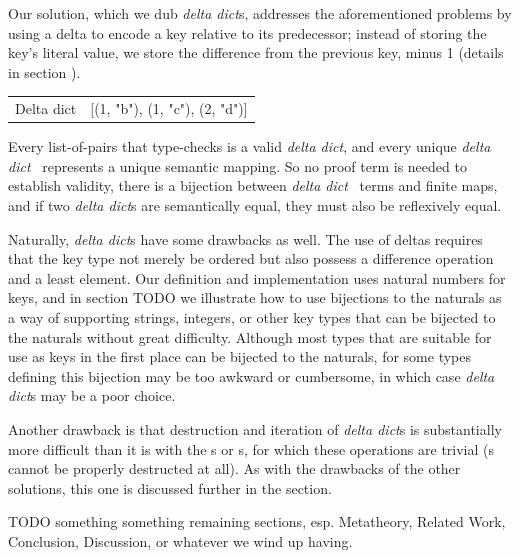 \documentclass[nonacm]{acmart}
\newcommand{\dd}{\emph{delta dict}}
\theoremstyle{slplain}
\numberwithin{thm}{section}
\begin{document}
Our solution, which we dub {\dd}s, addresses the aforementioned problems by using a delta to
encode a key relative to its predecessor; instead of storing the key's literal value, we store the difference
from the previous key, minus 1 (details in section ).
\\
\begin{tabular}{ l l }
 \quad\quad Delta dict & [(1, "b"), (1, "c"), (2, "d")]
\end{tabular}

Every list-of-pairs that type-checks is a valid \dd, and every unique \dd~ represents
a unique semantic mapping. So no proof term is needed to establish validity, there is a bijection between
\dd~ terms and finite maps, and if two {\dd}s are semantically equal, they must also be reflexively equal.

Naturally, {\dd}s have some drawbacks as well. The use of deltas requires that the key type not merely be
ordered but also possess a difference operation and a least element. Our definition and implementation uses
natural numbers for keys, and in section TODO we illustrate how to use bijections to the naturals as a way
of supporting strings, integers, or other key types that can be bijected to the naturals without great
difficulty. Although most types that are suitable for use as keys in the first place can be bijected to the
naturals, for some types defining this bijection may be too awkward or cumbersome, in which case {\dd}s may
be a poor choice.

Another drawback is that destruction and iteration of {\dd}s is substantially more
difficult than it is with the {\SAL}s or {\CAL}s, for which these operations are trivial
({\FPF}s cannot be properly destructed at all). As with the drawbacks of the other solutions, this one is
discussed further in the  section.

TODO something something remaining sections, esp. Metatheory, Related Work, Conclusion, Discussion, or
whatever we wind up having.
\end{document}
